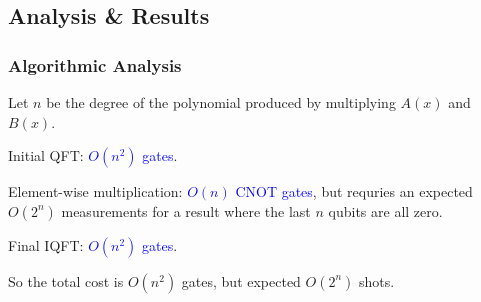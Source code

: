 \documentclass[
	11pt, %
]{beamer}
\begin{document}

\subsection{Analysis \& Results}
\begin{frame}
    \frametitle{Algorithmic Analysis}
    Let $n$ be the degree of the polynomial produced by multiplying $A(x)$ and $B(x)$.

    \bigskip
    Initial QFT: \textcolor{blue}{$O(n^2)$ gates}.

    \bigskip
    Element-wise multiplication: \textcolor{blue}{$O(n)$ CNOT gates}, 
    but requries an expected $O(2^n)$ measurements for a result where 
    the last $n$ qubits are all zero.

    \bigskip
    Final IQFT: \textcolor{blue}{$O(n^2)$ gates}.

    \bigskip
    So the total cost is $O(n^2)$ gates, but expected $O(2^n)$ shots.
\end{frame}

\end{document}
